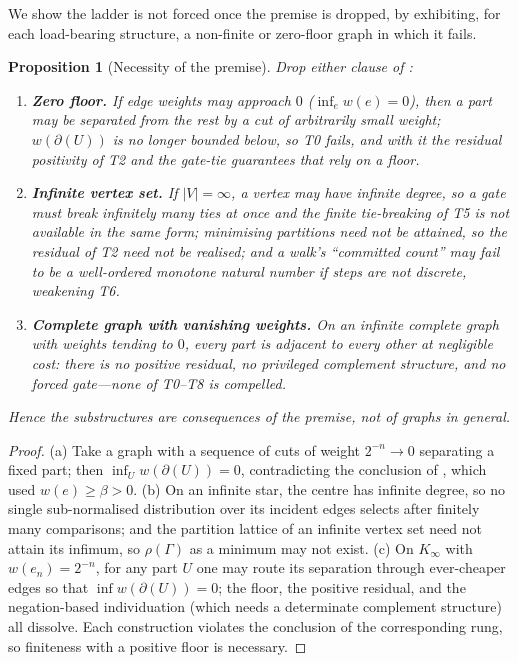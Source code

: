 \documentclass[11pt,a4paper]{article}
\theoremstyle{thmstyle}
\newtheorem{proposition}[theorem]{Proposition}
\theoremstyle{definition}
\theoremstyle{remark}
\newcommand{\Gph}{\Gamma}                 %
\newcommand{\V}{V}                        %
\newcommand{\wt}{w}                       %
\newcommand{\floorc}{\beta}               %
\newcommand{\cut}{\partial}               %
\newcommand{\Res}{\rho}                   %
\newcommand{\abs}[1]{\lvert#1\rvert}
\begin{document}
We show the ladder is not forced once the premise is dropped, by exhibiting, for
each load-bearing structure, a non-finite or zero-floor graph in which it fails.

\begin{proposition}[Necessity of the premise]
\label{prop:necessity}
Drop either clause of :
\begin{enumerate}[label=\textup{(\alph*)},leftmargin=2.2em]
\item \textbf{Zero floor.} If edge weights may approach $0$
\textup{(}$\inf_e\wt(e)=0$\textup{)}, then a part may be separated from the rest
by a cut of arbitrarily small weight; $\wt(\cut(U))$ is no longer bounded below,
so T0 fails, and with it the residual positivity of T2 and the gate-tie
guarantees that rely on a floor.
\item \textbf{Infinite vertex set.} If $\abs{\V}=\infty$, a vertex may have
infinite degree, so a gate must break infinitely many ties at once and the finite
tie-breaking of T5 is not available in the same form; minimising partitions need
not be attained, so the residual of T2 need not be realised; and a walk's
``committed count'' may fail to be a well-ordered monotone natural number if
steps are not discrete, weakening T6.
\item \textbf{Complete graph with vanishing weights.} On an infinite complete
graph with weights tending to $0$, every part is adjacent to every other at
negligible cost: there is no positive residual, no privileged complement
structure, and no forced gate---none of T0--T8 is compelled.
\end{enumerate}
Hence the substructures are consequences of the premise, not of graphs in
general.
\end{proposition}

\begin{proof}
(a) Take a graph with a sequence of cuts of weight $2^{-n}\to0$ separating a
fixed part; then $\inf_U\wt(\cut(U))=0$, contradicting the conclusion of
, which used $\wt(e)\ge\floorc>0$. (b) On an infinite star, the
centre has infinite degree, so no single sub-normalised distribution over its
incident edges selects after finitely many comparisons; and the partition lattice
of an infinite vertex set need not attain its infimum, so $\Res(\Gph)$ as a
minimum may not exist. (c) On $K_\infty$ with $\wt(e_n)=2^{-n}$, for any part $U$
one may route its separation through ever-cheaper edges so that
$\inf\wt(\cut(U))=0$; the floor, the positive residual, and the negation-based
individuation (which needs a determinate complement structure) all dissolve.
Each construction violates the conclusion of the corresponding rung, so finiteness
with a positive floor is necessary.
\end{proof}
\end{document}
